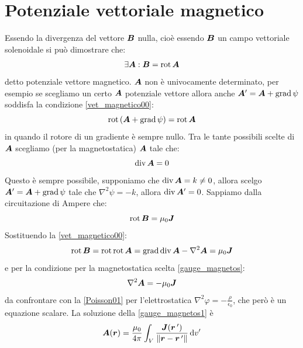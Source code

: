 \section{Potenziale vettoriale magnetico}
Essendo la divergenza del vettore $\boldsymbol{B}$ nulla, cioè essendo $\boldsymbol{B}$ un campo vettoriale solenoidale si può dimostrare che:
\begin{equation}
  \exists\boldsymbol{A}:\boldsymbol{B}=\operatorname{rot}\boldsymbol{A}
  \label{vet_magnetico00}
\end{equation}
detto potenziale vettore magnetico. $\boldsymbol{A}$ non è univocamente determinato, per esempio se scegliamo un certo $\boldsymbol{A}$ potenziale vettore allora anche $\boldsymbol{A}'=\boldsymbol{A}+\operatorname{grad}\psi$ soddisfa la condizione \eqref{vet_magnetico00}:
\[
  \operatorname{rot}\left(\boldsymbol{A}+\operatorname{grad}\psi\right)=\operatorname{rot}\boldsymbol{A}
\]
in quando il rotore di un gradiente è sempre nullo. Tra le tante possibili scelte di $\boldsymbol{A}$ scegliamo (per la magnetostatica) $\boldsymbol{A}$ tale che:
\begin{equation}
  \operatorname{div}\boldsymbol{A}=0
  \label{gauge_magnetos}
\end{equation}
Questo è sempre possibile, supponiamo che $\operatorname{div}\boldsymbol{A}=k\neq 0$, allora scelgo $\boldsymbol{A}'=\boldsymbol{A} +\operatorname{grad}\psi$ tale che $\nabla^2\psi = -k$, allora $\operatorname{div} \boldsymbol{A}'=0$. Sappiamo dalla circuitazione di Ampere che:
\begin{equation}
  \operatorname{rot}\boldsymbol{B}=\mu_0\boldsymbol{J}
\end{equation}
Sostituendo la \eqref{vet_magnetico00}:
\begin{equation}
  \operatorname{rot}\boldsymbol{B}=\operatorname{rot}\operatorname{rot}\boldsymbol{A}=\operatorname{grad}\operatorname{div}\boldsymbol{A}-\nabla^2\boldsymbol{A}=\mu_0\boldsymbol{J}
\end{equation}
e per la condizione per la magnetostatica scelta \eqref{gauge_magnetos}:
\begin{equation}
  \nabla^2\boldsymbol{A}=-\mu_0\boldsymbol{J}
  \label{gauge_magnetos1}
\end{equation}
da confrontare con la \eqref{Poisson01} per l'elettrostatica $\nabla^2\varphi = -\frac{\rho}{\epsilon_0}$, che però è un equazione scalare. La soluzione della \eqref{gauge_magnetos1} è
\begin{equation}
  \boldsymbol{A}(\boldsymbol{r})=\frac{\mu_0}{4\pi}\int_V\frac{\boldsymbol{J}(\boldsymbol{r}\,')}{\left\lVert\boldsymbol{r}-\boldsymbol{r}\,'\right\rVert}\,\mathrm{d} v'
  \label{vet_magnetico01}
\end{equation}
